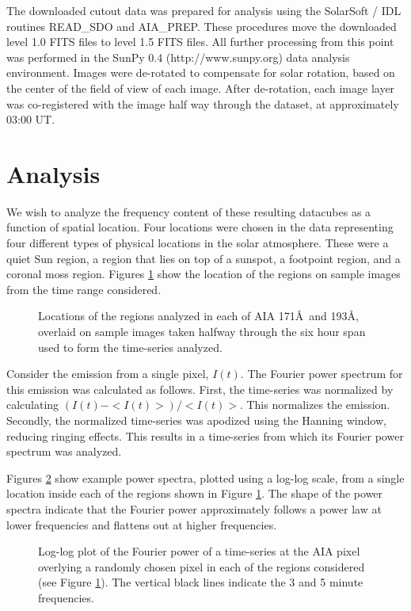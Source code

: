 \documentclass[preprint2]{aastex}
\begin{document}
The downloaded cutout data was prepared for analysis using the
SolarSoft / IDL routines READ\_SDO and AIA\_PREP.  These procedures
move the downloaded level 1.0 FITS files to level 1.5 FITS files.  All
further processing from this point was performed in the SunPy 0.4
(http://www.sunpy.org) data analysis environment.  Images were
de-rotated to compensate for solar rotation, based on the center of
the field of view of each image.  After de-rotation, each image layer
was co-registered with the image half way through the dataset, at
approximately 03:00 UT.

\section{Analysis}\label{sec:anal}
We wish to analyze the frequency content of these resulting datacubes
as a function of spatial location.  Four locations were chosen in the
data representing four different types of physical locations in the
solar atmosphere.  These were a quiet Sun region, a region that lies
on top of a sunspot, a footpoint region, and a coronal moss region.
Figures \ref{fig:loc171193} show the location of the regions on sample
images from the time range considered.

\begin{figure}
\caption{Locations of the regions analyzed in each of AIA 171\AA\ and
  193\AA, overlaid on sample images taken halfway through the six hour
  span used to form the time-series analyzed.}
\label{fig:loc171193}
\end{figure}

Consider the emission from a single pixel, $I(t)$.  The Fourier power
spectrum for this emission was calculated as follows.  First, the
time-series was normalized by calculating $(I(t) - <I(t)>)/<I(t)>$.
This normalizes the emission.  Secondly, the normalized time-series
was apodized using the Hanning window, reducing ringing effects.  This
results in a time-series from which its Fourier power spectrum was
analyzed. 

Figures \ref{fig:compare171193} show example power spectra, plotted using
a log-log scale, from a single location inside each of the regions
shown in Figure \ref{fig:loc171193}.  The shape of
the power spectra indicate that the Fourier power approximately
follows a power law at lower frequencies and flattens out at higher
frequencies.

\begin{figure}
\caption{Log-log plot of the Fourier power of a time-series at the AIA
  pixel overlying a randomly chosen pixel in each of the regions
  considered (see Figure \protect\ref{fig:loc171193}).  The vertical
  black lines indicate the 3 and 5 minute frequencies.}
\label{fig:compare171193}
\end{figure}
\end{document}
